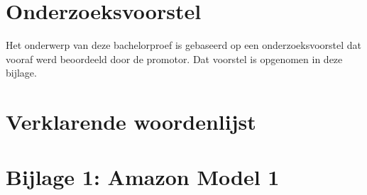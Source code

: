 \documentclass{bachproef-tin}
\begin{document}
%
%




\appendix
\renewcommand{\chaptername}{Appendix}


\chapter{Onderzoeksvoorstel}

Het onderwerp van deze bachelorproef is gebaseerd op een onderzoeksvoorstel dat vooraf werd beoordeeld door de promotor. Dat voorstel is opgenomen in deze bijlage.



\chapter{Verklarende woordenlijst}

\chapter{Bijlage 1: Amazon Model 1}

\clearpage


\printbibliography[heading=bibintoc]
\end{document}
